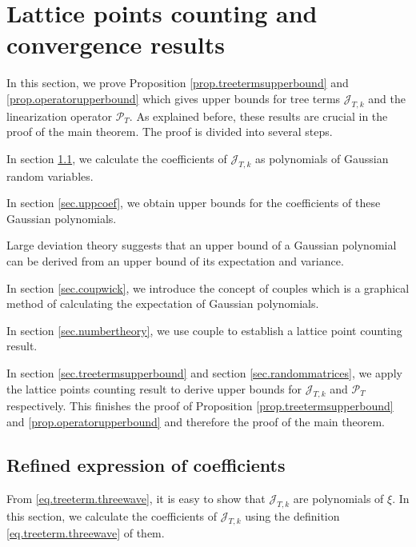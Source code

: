 \section{Lattice points counting and convergence results}
In this section, we prove Proposition \ref{prop.treetermsupperbound} and \ref{prop.operatorupperbound} which gives upper bounds for tree terms $\mathcal{J}_{T,k}$ and the linearization operator $\mathcal{P}_T$. As explained before, these results are crucial in the proof of the main theorem. The proof is divided into several steps.

In section \ref{sec.refexp}, we calculate the coefficients of $\mathcal{J}_{T,k}$ as polynomials of Gaussian random variables.

In section \ref{sec.uppcoef}, we obtain upper bounds for the coefficients of these Gaussian polynomials.

Large deviation theory suggests that an upper bound of a Gaussian polynomial can be derived from an upper bound of its expectation and variance.

In section \ref{sec.coupwick}, we introduce the concept of couples which is a graphical method of calculating the expectation of Gaussian polynomials.

In section \ref{sec.numbertheory}, we use couple to establish a lattice point counting result.

In section \ref{sec.treetermsupperbound} and section \ref{sec.randommatrices}, we apply the lattice points counting result to derive upper bounds for  $\mathcal{J}_{T,k}$ and $\mathcal{P}_T$ respectively. This finishes the proof of Proposition \ref{prop.treetermsupperbound} and \ref{prop.operatorupperbound} and therefore the proof of the main theorem.


\subsection{Refined expression of coefficients}\label{sec.refexp} From \eqref{eq.treeterm.threewave}, it is easy to show that $\mathcal{J}_{T,k}$ are polynomials of $\xi$. In this section, we calculate the coefficients of $\mathcal{J}_{T,k}$ using the definition \eqref{eq.treeterm.threewave} of them.

